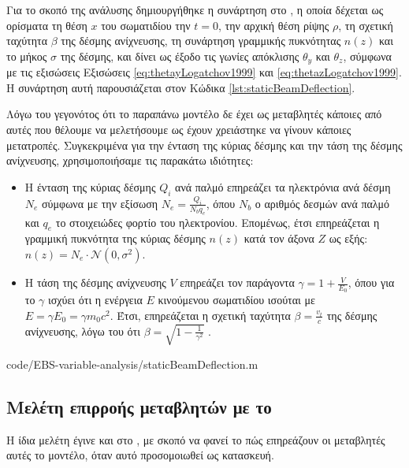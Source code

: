 Για το σκοπό της ανάλυσης δημιουργήθηκε η συνάρτηση  στο , η οποία δέχεται ως ορίσματα τη θέση $x$ του σωματιδίου την $t = 0$, την αρχική θέση ρίψης $\rho$, τη σχετική ταχύτητα $\beta$ της δέσμης ανίχνευσης, τη συνάρτηση γραμμικής πυκνότητας $n(z)$ και το μήκος $\sigma$ της δέσμης, και δίνει ως έξοδο τις γωνίες απόκλισης $\theta_y$ και $\theta_z$, σύμφωνα με τις εξισώσεις Εξισώσεις \ref{eq:thetayLogatchov1999} και \ref{eq:thetazLogatchov1999}.
Η συνάρτηση αυτή παρουσιάζεται στον Κώδικα \ref{lst:staticBeamDeflection}.

Λόγω του γεγονότος ότι το παραπάνω μοντέλο δε έχει ως μεταβλητές κάποιες από αυτές που θέλουμε να μελετήσουμε ως έχουν χρειάστηκε να γίνουν κάποιες μετατροπές. 
Συγκεκριμένα για την ένταση της κύριας δέσμης και την τάση της δέσμης ανίχνευσης, χρησιμοποιήσαμε τις παρακάτω ιδιότητες:

\begin{itemize}
	\item Η ένταση της κύριας δέσμης $Q_i$ ανά παλμό επηρεάζει τα ηλεκτρόνια ανά δέσμη $N_e$ σύμφωνα με την εξίσωση $N_e = \frac{Q_i}{N_b q_e}$, όπου $N_b$ ο αριθμός δεσμών ανά παλμό και $q_e$ το στοιχειώδες φορτίο του ηλεκτρονίου.
	Επομένως, έτσι επηρεάζεται η γραμμική πυκνότητα της κύριας δέσμης $n(z)$ κατά τον άξονα $Z$ ως εξής: $n(z) = N_e \cdot \mathcal{N}\left(0, \sigma^2 \right)$.
	\item Η τάση της δέσμης ανίχνευσης $V$ επηρεάζει τον παράγοντα  $\gamma = 1 + \frac{V}{E_0}$, όπου για το $\gamma$ ισχύει ότι η ενέργεια $E$ κινούμενου σωματιδίου ισούται με $E = \gamma E_0 = \gamma m_ 0c^2$. 
	Έτσι, επηρεάζεται η σχετική ταχύτητα $\beta =\frac{v_t}{c}$ της δέσμης ανίχνευσης, λόγω του ότι $\beta = \sqrt{1 - \frac{1}{\gamma^2}}$ \cite{Forshaw2014}.
\end{itemize}


{code/EBS-variable-analysis/staticBeamDeflection.m}

\subsection{Μελέτη επιρροής μεταβλητών με το } \label{sub:variable-analysis-CST}
Η ίδια μελέτη έγινε και στο , με σκοπό να φανεί το πώς επηρεάζουν οι μεταβλητές αυτές το μοντέλο, όταν αυτό προσομοιωθεί ως κατασκευή.

